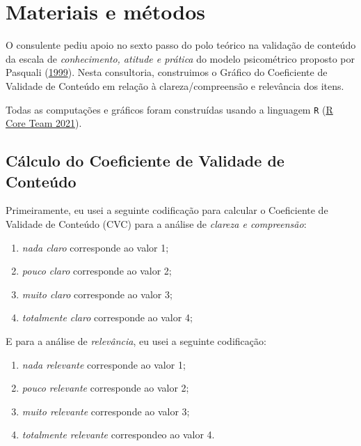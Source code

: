 \documentclass[
]{article}
\providecommand{\tightlist}{%
  \setlength{\itemsep}{0pt}\setlength{\parskip}{0pt}}
\begin{document}
\hypertarget{materiais-e-muxe9todos}{%
\section{Materiais e métodos}\label{materiais-e-muxe9todos}}

O consulente pediu apoio no sexto passo do polo teórico na validação de conteúdo da escala de \emph{conhecimento, atitude e prática } do modelo psicométrico proposto por Pasquali (\protect\hyperlink{ref-pasquali1999elaboraccao}{1999}). Nesta consultoria, construimos o Gráfico do Coeficiente de Validade de Conteúdo em relação à clareza/compreensão e relevância dos itens.

Todas as computações e gráficos foram construídas usando a linguagem \texttt{R} (\protect\hyperlink{ref-Rlang}{R Core Team 2021}).

\hypertarget{cuxe1lculo-do-coeficiente-de-validade-de-conteuxfado}{%
\subsection{Cálculo do Coeficiente de Validade de Conteúdo}\label{cuxe1lculo-do-coeficiente-de-validade-de-conteuxfado}}

Primeiramente, eu usei a seguinte codificação para calcular o Coeficiente de Validade de Conteúdo (CVC) para a análise de \emph{clareza e compreensão}:

\begin{enumerate}
\def\labelenumi{\arabic{enumi}.}
\tightlist
\item
  \emph{nada claro} corresponde ao valor 1;
\item
  \emph{pouco claro} corresponde ao valor 2;
\item
  \emph{muito claro} corresponde ao valor 3;
\item
  \emph{totalmente claro} corresponde ao valor 4;
\end{enumerate}

E para a análise de \emph{relevância}, eu usei a seguinte codificação:

\begin{enumerate}
\def\labelenumi{\arabic{enumi}.}
\tightlist
\item
  \emph{nada relevante} corresponde ao valor 1;
\item
  \emph{pouco relevante} corresponde ao valor 2;
\item
  \emph{muito relevante} corresponde ao valor 3;
\item
  \emph{totalmente relevante} correspondeo ao valor 4.
\end{enumerate}
\end{document}
